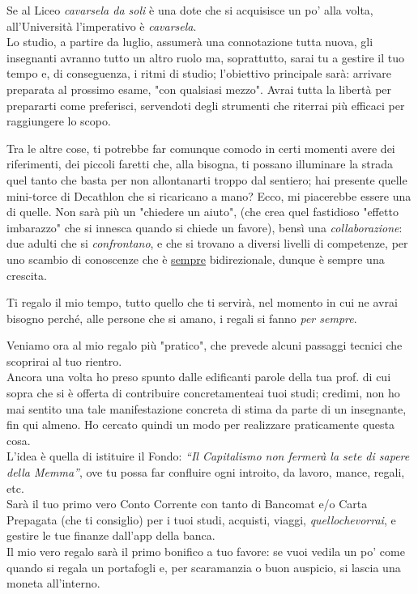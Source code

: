 \documentclass[11pt]{article}
\begin{document}
Se al Liceo \emph{cavarsela da soli} è una dote che si acquisisce un po’ alla volta, all’Università l’imperativo è \emph{cavarsela}.\\
Lo studio, a partire da luglio, assumerà una connotazione tutta nuova, gli insegnanti avranno tutto un altro ruolo  ma, soprattutto, sarai tu a gestire il tuo tempo e, di  conseguenza, i ritmi di studio; l'obiettivo principale sarà: arrivare preparata al prossimo esame, "con qualsiasi mezzo". Avrai tutta la libertà per prepararti come preferisci, servendoti degli strumenti che riterrai più efficaci per raggiungere lo scopo.

Tra le altre cose, ti potrebbe far comunque comodo in certi momenti avere dei riferimenti, dei piccoli faretti che, alla bisogna, ti possano illuminare la strada quel tanto che basta per non allontanarti troppo dal sentiero; hai presente quelle mini-torce di Decathlon che si ricaricano a mano? Ecco, mi piacerebbe essere una di quelle.
Non sarà più un "chiedere un aiuto", (che crea quel fastidioso "effetto imbarazzo" che si innesca quando si chiede un favore), bensì una {\em collaborazione}: due adulti che si {\em confrontano}, e che si trovano a diversi livelli di competenze, per uno scambio di conoscenze che è \underline{sempre} bidirezionale, dunque è sempre una crescita.

Ti regalo il mio tempo, tutto quello che ti servirà, nel momento in cui ne avrai bisogno perché, alle persone che si amano, i regali si fanno {\em per sempre}.

Veniamo ora al mio regalo più "pratico", che prevede alcuni passaggi tecnici che scoprirai al tuo rientro.\\
Ancora una volta ho preso spunto dalle edificanti parole della tua prof. di cui sopra che si è offerta di contribuire concretamenteai tuoi studi; credimi, non ho mai sentito una tale manifestazione concreta di stima da parte di un insegnante, fin qui almeno.
Ho cercato quindi un modo per realizzare praticamente questa cosa.\\
L’idea è quella di istituire il Fondo: {\em “Il Capitalismo non fermerà la sete di sapere della Memma”}, ove tu possa far confluire ogni introito, da lavoro, mance, regali, etc.\\
Sarà il tuo primo vero Conto Corrente con tanto di Bancomat e/o Carta Prepagata (che ti consiglio) per i tuoi studi, acquisti, viaggi, {\em quellochevorrai}, e gestire le tue finanze dall’app della banca.\\
Il mio vero regalo sarà il primo bonifico a tuo favore: se vuoi vedila un po’ come quando si regala un portafogli e, per scaramanzia o buon auspicio, si lascia una moneta all’interno.
\end{document}
